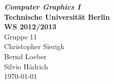 \begin{titlepage}
  \begin{center}
    \vspace*{1cm}
    \textbf
    {\emph
      {\Large Computer Graphics I}}\\[1cm]
    \textbf
    {\Large Technische Universität Berlin}\\[.5cm]
    \textbf
    {\Large WS 2012/2013}\\[2cm]
    \vfill
    {\Large Gruppe 11}\\[1cm]
    Christopher Sierigk\\
    Bernd Loeber\\
    Silvio Hädrich\\
    \vspace*{2cm}
    \today
  \end{center}
  \vspace*{2cm}
\end{titlepage}
